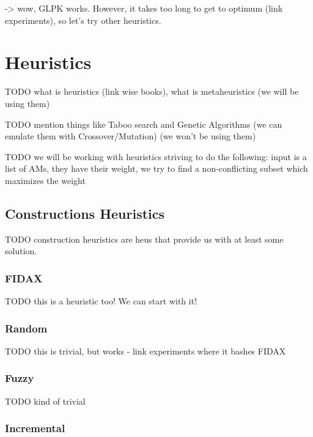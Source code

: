 \documentclass[a4paper,12pt,oneside]{report}
\begin{document}
 -> wow, GLPK works. However, it takes too long to get to optimum (link experiments), so let's try other heuristics.
 
\section{Heuristics}

TODO what is heuristics (link wise books), what is metaheuristics (we will be using them)

TODO mention things like Taboo search and Genetic Algorithms (we can emulate them with Crossover/Mutation) (we won't be using them)

TODO we will be working with heuristics striving to do the following: input is a list of AMs, they have their weight, we try to find a non-conflicting subset which maximizes the weight

\subsection{Constructions Heuristics}


TODO construction heuristics are heus that provide us with at least some solution.

\subsubsection{FIDAX}

TODO this is a heuristic too! We can start with it!

\subsubsection{Random}

TODO this is trivial, but works - link experiments where it bashes FIDAX

\subsubsection{Fuzzy}

TODO kind of trivial

\subsubsection{Incremental}
\end{document}
